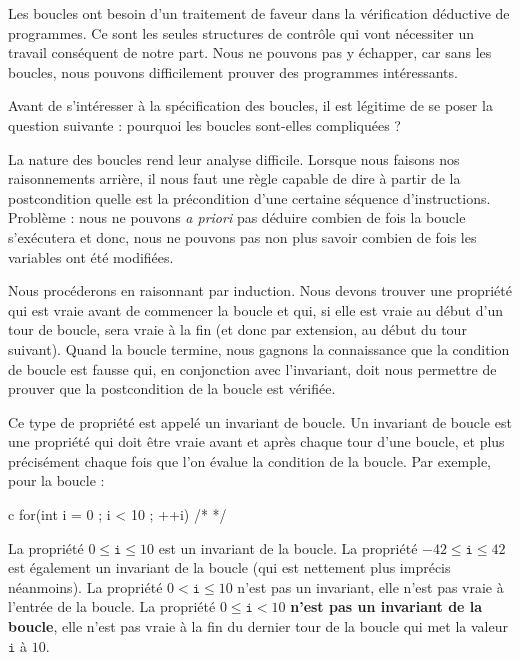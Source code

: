 Les boucles ont besoin d'un traitement de faveur dans la vérification déductive
de programmes. Ce sont les seules structures de contrôle qui vont nécessiter un
travail conséquent de notre part. Nous ne pouvons pas y échapper, car sans les
boucles, nous pouvons difficilement prouver des programmes intéressants.



Avant de s'intéresser à la spécification des boucles, il est légitime de se
poser la question suivante : pourquoi les boucles sont-elles compliquées ?



\label{l3:statements-loops-invariant}


La nature des boucles rend leur analyse difficile. Lorsque nous faisons nos
raisonnements arrière, il nous faut une règle capable de dire à partir de la
postcondition quelle est la précondition d'une certaine séquence
d'instructions. Problème : nous ne pouvons \textit{a priori} pas déduire combien de
fois la boucle s'exécutera et donc, nous ne pouvons pas non
plus savoir combien de fois les variables ont été modifiées.



Nous procéderons en raisonnant par induction. Nous devons trouver une
propriété qui est vraie avant de commencer la boucle et qui, si elle est vraie
au début d'un tour de boucle, sera vraie à la fin (et donc par extension, au
début du tour suivant). Quand la boucle termine, nous gagnons la connaissance
que la condition de boucle est fausse qui, en conjonction avec l'invariant,
doit nous permettre de prouver que la postcondition de la boucle est vérifiée.



Ce type de propriété est appelé un invariant de boucle. Un invariant de boucle
est une propriété qui doit être vraie avant et après chaque tour d'une boucle,
et plus précisément chaque fois que l'on évalue la condition de la boucle.
Par exemple, pour la boucle :



\begin{CodeBlock}{c}
for(int i = 0 ; i < 10 ; ++i){ /* */ }
\end{CodeBlock}



La propriété $0 \leq \texttt{i} \leq 10$ est un invariant de la boucle. La
propriété  $-42 \leq \texttt{i} \leq 42$ est également un invariant de la boucle
(qui est nettement plus imprécis néanmoins). La propriété $0 < \texttt{i} \leq 10$
n'est pas un invariant, elle n'est pas vraie à l'entrée de la boucle. La propriété
$0 \leq \texttt{i} < 10$ \textbf{n'est pas un invariant de la boucle}, elle n'est
pas vraie à la fin du dernier tour de la boucle qui met la valeur $\texttt{i}$ à
$10$.




